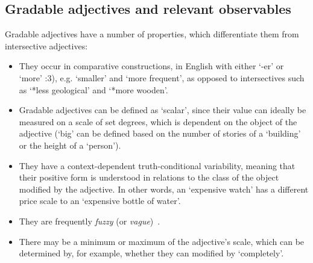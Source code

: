 \documentclass[11pt]{article}
\begin{document}
\subsection{Gradable adjectives and relevant observables} \label{sec:gradables}

Gradable adjectives have a number of properties, which differentiate them
from intersective adjectives:

\begin{itemize}[noitemsep]
\item They occur in comparative constructions, in English with either `-er' or `more' \cite{kennedy1999scalar}:3), e.g. `smaller' and `more frequent', as opposed to intersectives such as `*less geological' and `*more wooden'.
\item Gradable adjectives can be defined as `scalar', since their value can ideally be measured on a scale of set degrees, which is dependent on the object of the adjective (`big' can be defined based on the number of stories of a `building' or the height of a `person').
\item They have a context-dependent truth-conditional variability, meaning that their positive form
    is understood in relations to the class of the object modified by the adjective. In other words, an
    `expensive watch' has a different price scale to an `expensive bottle of water'.
\item They are frequently \emph{fuzzy} (or \emph{vague})~\cite{kennedy2007vagueness}.

\item There may be a minimum or maximum of the adjective's scale, which can be determined
by, for example, whether they can modified by `completely'.
\end{itemize}
\end{document}
